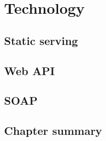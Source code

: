 \chapter{Technology}
\label{chap:Technology}

\section{Static serving}
\label{sec:Static serving}

\section{Web API}
\label{sec:Web API}

\section{SOAP}
\label{sec:SOAP}


\section{Chapter summary}
